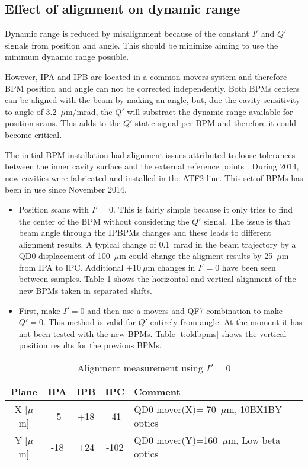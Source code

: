 \subsection{Effect of alignment on dynamic range}
Dynamic range is reduced by misalignment because of the constant $I'$ and $Q'$ signals from position and angle. This should be minimize aiming to use the minimum dynamic range possible.\par
However, IPA and IPB are located in a common movers system and therefore BPM position and angle can not be corrected independently. Both BPMs centers can be aligned with the beam by making an angle, but, due the cavity sensitivity to angle of 3.2~$\mu$m/mrad, the $Q'$ will substract the dynamic range available for position scans. This adds to the $Q'$ static signal per BPM and therefore it could become critical.\par
The initial BPM installation \cite{Bambade2013} had alignment issues attributed to loose tolerances between the inner cavity surface and the external reference points \cite{Siwon2014}. During 2014, new cavities were fabricated and installed in the ATF2 line. This set of BPMs has been in use since November 2014.\par
\begin{itemize}
 \item Position scans with $I'=0$. This is fairly simple because it only tries to find the center of the BPM without considering the $Q'$ signal. The issue is that beam angle through the IPBPMs changes and these leads to different alignment results. A typical change of 0.1~mrad in the beam trajectory by a QD0 displacement of 100~$\mu$m could change the aligment results by 25~$\mu$m from IPA to IPC. Additional $\pm10~\mu$m changes in $I'=0$ have been seen between samples. Table \ref{t:newalign} shows the horizontal and vertical alignment of the new BPMs taken in separated shifts.\par
 \item First, make $I'=0$ and then use a movers and QF7 combination to make $Q'=0$. This method is valid for $Q'$ entirely from angle. At the moment it has not been tested with the new BPMs. Table \ref{t:oldbpms} shows the vertical position results for the previous BPMs.\par
\end{itemize}
\begin{table}[h]
\centering
 \begin{tabular}{c||c|c|c|l}\hline
  Plane & IPA & IPB & IPC & Comment\\\hline\hline
  X [$\mu$m] & -5 & +18 & -41 & QD0 mover(X)=-70~$\mu$m, 10BX1BY optics\\
  Y [$\mu$m] & -18 & +24 & -102 & QD0 mover(Y)=160~$\mu$m, Low beta optics\\\hline
 \end{tabular}\caption{Alignment measurement using $I'=0$}\label{t:newalign}
\end{table}
